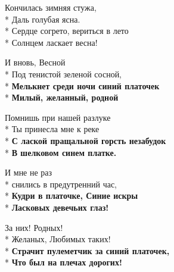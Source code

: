 \medskip

\begin{minipage}{\linewidth}
Кончилась зимняя стужа,\\*
Даль голубая ясна.\\*
Сердце согрето, вериться в лето\\*
Солнцем ласкает весна!\\
\end{minipage}\par\medskip\nobreak

\medskip

\begin{minipage}{\linewidth}
И вновь, Весной\\*
Под тенистой зеленой сосной,\\*
\textbf{Мелькнет среди ночи синий платочек}\\*
\textbf{Милый, желанный, родной}\\
\end{minipage}\par\medskip\nobreak

\medskip

\begin{minipage}{\linewidth}
Помнишь при нашей разлуке\\*
Ты принесла мне к реке\\*
\textbf{С лаской пращальной горсть незабудок}\\*
\textbf{В шелковом синем платке.}\\
\end{minipage}\par\medskip\nobreak

\medskip

\begin{minipage}{\linewidth}
И мне не раз\\*
снились в предутренний час,\\*
\textbf{Кудри в платочке, Синие искры}\\*
\textbf{Ласковых девечьих глаз!}\\
\end{minipage}\par\medskip\nobreak

\medskip

\begin{minipage}{\linewidth}
За них! Родных!\\*
Желаных, Любимых таких!\\*
\textbf{Страчит пулеметчик за синий платочек,}\\*
\textbf{Что был на плечах дорогих!}\\
\end{minipage}

